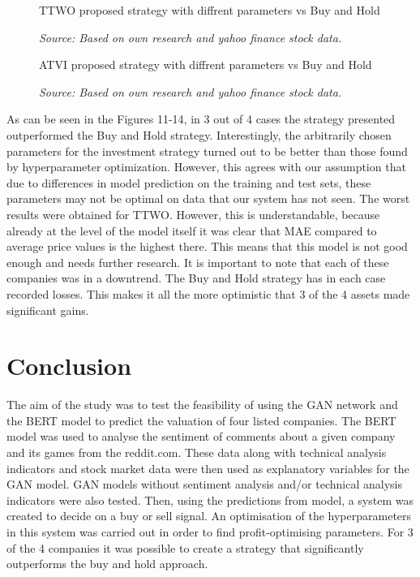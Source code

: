 \documentclass[11pt]{article} %
\begin{document}
\begin{figure}[H]
\caption{TTWO proposed strategy with diffrent parameters vs Buy and Hold}
\begin{adjustbox}{width=1.3\textwidth,center}

\end{adjustbox}
\caption*{\textit{Source: Based on own research and yahoo finance stock data.}}
\end{figure}

\begin{figure}[H]
\caption{ATVI proposed strategy with diffrent parameters vs Buy and Hold}
\begin{adjustbox}{width=1.3\textwidth,center}

\end{adjustbox}
\caption*{\textit{Source: Based on own research and yahoo finance stock data.}}
\end{figure}


 As can be seen in the Figures 11-14, in 3 out of 4 cases the strategy  presented outperformed the Buy and Hold strategy. Interestingly, the arbitrarily chosen parameters for the investment strategy turned out to be better than those found by hyperparameter optimization. However, this agrees with our assumption that due to differences in model prediction on the training and test sets, these parameters may not be optimal on data that our system has not seen. The worst results were obtained for TTWO. However, this is understandable, because already at the level of the model itself it was clear that MAE compared to average price values is the highest there. This means that this model is not good enough and needs further research. It is important to note that each of these companies was in a downtrend. The Buy and Hold strategy has in each case recorded losses. This makes it all the more optimistic that 3 of the 4 assets made significant gains. 

\section{Conclusion}

The aim of the study was to test the feasibility of using the GAN network and the BERT model to predict the valuation of four listed companies. The BERT model was used to analyse the sentiment of comments about a given company and its games from the reddit.com. These data along with technical analysis indicators and stock market data were then used as explanatory variables for the GAN model. GAN models without sentiment analysis and/or technical analysis indicators were also tested. Then, using the predictions from model, a system was created to decide on a buy or sell signal. An optimisation of the hyperparameters in this system was carried out in order to find profit-optimising parameters. For 3 of the 4 companies it was possible to create a strategy that significantly outperforms the buy and hold approach. \\
\end{document}
